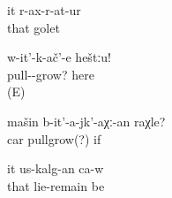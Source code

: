 \begin{exe}
	\ex	\label{ex:He left her (at home)}
	\gll	it	r-ax-r-at-ur\\
		that	golet\\
	\glt	{}

	\ex	\label{ex:Move here}
	\gll	w-it'-k-ač'-e	heštːu!\\
		pull--grow?	here\\
	\glt	{} (E)

	\ex	\label{ex:(What) if the car does not move}
	\gll	mašin	b-it'-a-jk'-aχː-an	raχle?\\
		car	pullgrow(?)	if\\
	\glt	{}

	\ex	\label{ex:He will / should go to sleep}
	\gll	it	us-kalg-an	ca-w\\
		that	lie-remain	be\\
	\glt	{}
\end{exe}
